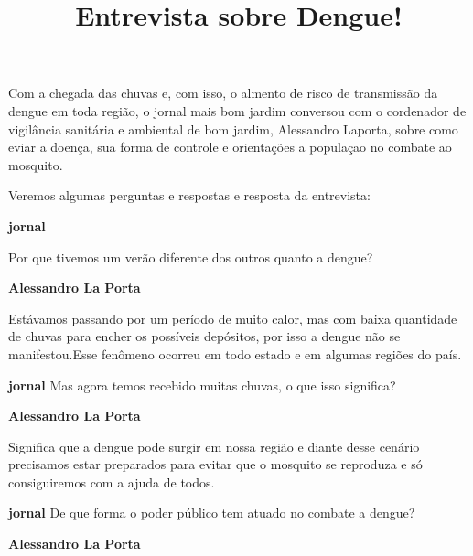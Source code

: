 \documentclass[12pt]{memoir}
\newenvironment{Entrevista}{\par
\textbf{jornal}}{\par
\textbf{Alessandro La Porta}}
\begin{document}
\title{Entrevista sobre Dengue!}
\maketitle

Com a chegada das chuvas e, com isso, o almento de risco de transmissão  da dengue em toda região,  o jornal mais bom jardim conversou com o cordenador de vigilância sanitária e ambiental de bom jardim, Alessandro Laporta, sobre como eviar a doença, sua forma de controle e orientações a populaçao no combate ao mosquito.\\\par
Veremos algumas perguntas e respostas e resposta da entrevista:\\\par


\begin{Entrevista}

Por que tivemos um verão diferente dos outros quanto a dengue?\\

\end{Entrevista}

Estávamos passando por um período de muito calor, mas com baixa quantidade de chuvas para encher os possíveis depósitos, por isso a dengue não se manifestou.\@ Esse fenômeno ocorreu em todo estado e em algumas regiões do país.\\\par
\begin{Entrevista}
Mas agora temos recebido muitas chuvas, o que isso significa?\\
\end{Entrevista}

Significa que a dengue pode surgir em nossa região e diante desse cenário precisamos estar preparados para evitar que o mosquito se reproduza e só consiguiremos com a ajuda de todos.\\
\begin{Entrevista}
De que forma o poder público tem atuado no combate a dengue?\\
\end{Entrevista}
\end{document}
